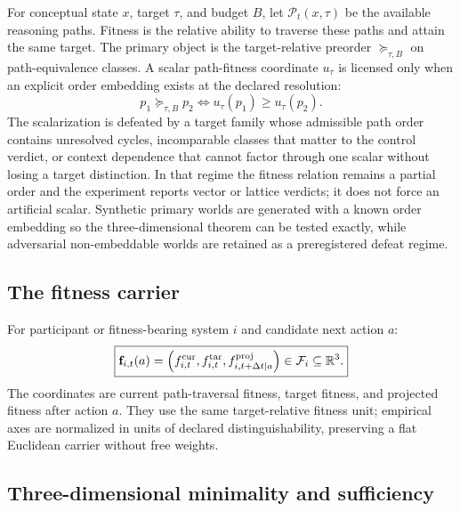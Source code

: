 \documentclass[11pt]{article}
\newcommand{\F}{\mathcal{F}}
\newcommand{\Pp}{\mathcal{P}}
\begin{document}
For conceptual state $x$, target $\tau$, and budget $B$, let $\Pp_t(x,\tau)$ be the available reasoning paths. Fitness is the relative ability to traverse these paths and attain the same target. The primary object is the target-relative preorder $\succeq_{\tau,B}$ on path-equivalence classes. A scalar path-fitness coordinate $u_\tau$ is licensed only when an explicit order embedding exists at the declared resolution:
\begin{equation}
p_1\succeq_{\tau,B}p_2\Longleftrightarrow u_\tau(p_1)\ge u_\tau(p_2).
\end{equation}
The scalarization is defeated by a target family whose admissible path order contains unresolved cycles, incomparable classes that matter to the control verdict, or context dependence that cannot factor through one scalar without losing a target distinction. In that regime the fitness relation remains a partial order and the experiment reports vector or lattice verdicts; it does not force an artificial scalar. Synthetic primary worlds are generated with a known order embedding so the three-dimensional theorem can be tested exactly, while adversarial non-embeddable worlds are retained as a preregistered defeat regime.

\subsection{The fitness carrier}

For participant or fitness-bearing system $i$ and candidate next action $a$:
\begin{equation}
\boxed{\mathbf f_{i,t}(a)=\left(f^{\rm cur}_{i,t},f^{\rm tar}_{i,t},f^{\rm proj}_{i,t+\Delta t\mid a}\right)\in\F_i\subseteq\mathbb R^3.}
\end{equation}
The coordinates are current path-traversal fitness, target fitness, and projected fitness after action $a$. They use the same target-relative fitness unit; empirical axes are normalized in units of declared distinguishability, preserving a flat Euclidean carrier without free weights.

\subsection{Three-dimensional minimality and sufficiency}
\end{document}
